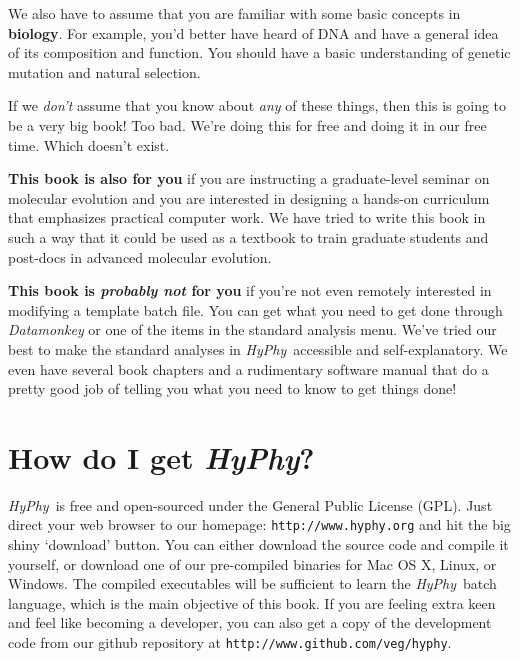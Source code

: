 \documentclass[12pt,twoside,openright]{book}
\newcommand{\hyphy}{\textit{HyPhy}}
\begin{document}
We also have to assume that you are familiar with some basic concepts in \textbf{biology}.  For example, you'd better have heard of DNA and have a general idea of its composition and function.  You should have a basic understanding of genetic mutation and natural selection.  

If we \textit{don't} assume that you know about {\it any} of these things, then this is going to be a very big book!  Too bad.  We're doing this for free and doing it in our free time.  Which doesn't exist.

\textbf{This book is also for you} if you are instructing a graduate-level seminar on molecular evolution and you are interested in designing a hands-on curriculum that emphasizes practical computer work.  We have tried to write this book in such a way that it could be used as a textbook to train graduate students and post-docs in advanced molecular evolution.  

\textbf{This book is \textit{probably not} for you} if you're not even remotely interested in modifying a template batch file.  You can get what you need to get done through {\it Datamonkey} or one of the items in the standard analysis menu.  We've tried our best to make the standard analyses in \hyphy\ accessible and self-explanatory.  We even have several book chapters and a rudimentary software manual that do a pretty good job of telling you what you need to know to get things done!  





\section {How do I get \hyphy?}

\hyphy\ is free and open-sourced under the General Public License (GPL).  Just direct your web browser to our homepage: {\tt http://www.hyphy.org} and hit the big shiny `download' button.  You can either download the source code and compile it yourself, or download one of our pre-compiled binaries for Mac OS X, Linux, or Windows.  The compiled executables will be sufficient to learn the \hyphy\ batch language, which is the main objective of this book.  If you are feeling extra keen and feel like becoming a developer, you can also get a copy of the development code from our github repository at {\tt http://www.github.com/veg/hyphy}.


\end{document}
